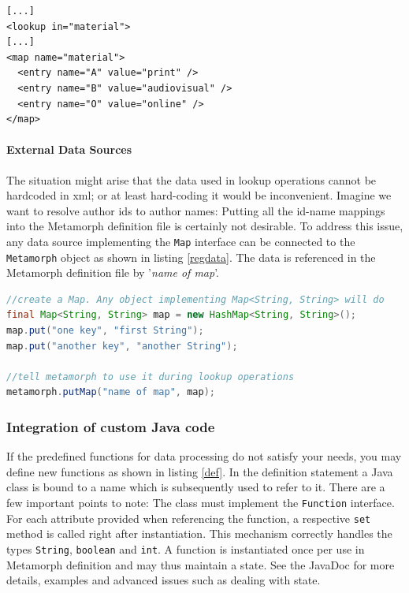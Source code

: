 \documentclass[12pt,a4paper]{article}
\begin{document}
\begin{lstlisting}[float=htb, label=maps,caption={Defining a standalone map, which can be independently addressed by different lookup functions.}]
[...]
<lookup in="material">
[...]
<map name="material">
  <entry name="A" value="print" />
  <entry name="B" value="audiovisual" />
  <entry name="O" value="online" />
</map>
\end{lstlisting}

\paragraph{External Data Sources}

The situation might arise that the data used in lookup operations cannot be hardcoded in xml; or at least hard-coding it would be inconvenient. Imagine we want to resolve author ids to author names: Putting all the id-name mappings into the Metamorph definition file is certainly not desirable.
To address this issue, any data source implementing the {\tt Map} interface can be connected to the {\tt Metamorph} object as shown in listing \ref{regdata}. The data is referenced in the Metamorph definition file by '{\it name of map}'.

\begin{lstlisting}[float=htb, label=regdata,caption= Registering a map with the metamorph object., language=Java]
//create a Map. Any object implementing Map<String, String> will do
final Map<String, String> map = new HashMap<String, String>();
map.put("one key", "first String");
map.put("another key", "another String");

//tell metamorph to use it during lookup operations
metamorph.putMap("name of map", map);
\end{lstlisting}



\subsubsection{Integration of custom Java code}\label{customfunc}

If the predefined functions for data processing do not satisfy your needs, you may define new functions as shown in listing \ref{def}.
In the definition statement a Java class is bound to a name which is subsequently used to refer to it. There are a few important points to note:
The class must implement the {\tt Function} interface. For each attribute provided when referencing the function, a respective {\tt set} method is called right after instantiation. This mechanism correctly handles the types {\tt String}, {\tt boolean} and {\tt int}. A function is instantiated once per use in Metamorph definition and may thus maintain a state. See the JavaDoc for more details, examples and advanced issues such as dealing with state.
\end{document}
